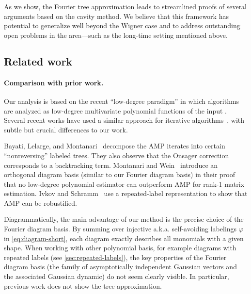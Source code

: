 \documentclass[12pt]{article}
\begin{document}
As we show, the Fourier tree approximation
leads to streamlined proofs of several arguments
based on the cavity method. We believe that
this framework has potential to generalize well beyond the Wigner case and to address outstanding
open problems in the area---such as the long-time setting mentioned above.



\subsection{Related work}\label{sec:related_work}

\paragraph{Comparison with prior work.}
Our analysis is based on the recent ``low-degree paradigm'' in which
algorithms are analyzed as low-degree multivariate polynomial functions of the input \cite{kunisky2019notes}.
Several recent works have used a similar approach for iterative algorithms~\cite{bayati2015universality,montanari2022equivalence,ivkov2023semidefinite}, with subtle but crucial differences to our work.

Bayati, Lelarge, and Montanari~\cite{bayati2015universality} decompose the AMP iterates into certain ``nonreversing'' labeled trees. 
They also observe that the Onsager correction corresponds to a backtracking term. Montanari and Wein~\cite[Section 4.2]{montanari2022equivalence} introduce an orthogonal diagram
basis (similar to our Fourier diagram basis) 
in their proof that no low-degree polynomial
estimator
can outperform AMP for rank-1 matrix estimation.
Ivkov and Schramm~\cite{ivkov2023semidefinite} use a repeated-label representation to show that AMP can be
robustified.


Diagrammatically, the main advantage of our method is the precise choice of the Fourier diagram basis.
By summing over {injective} a.k.a. {self-avoiding} labelings $\varphi$ in \cref{eq:diagram-short}, each diagram exactly describes all monomials with a given shape.
When working with other polynomial basis, for example diagrams with repeated labels \cite{bayati2015universality,ivkov2023semidefinite} (see \cref{sec:repeated-labels}),
the key properties of the Fourier diagram basis (the family of asymptotically independent Gaussian vectors and the associated Gaussian dynamic) do not seem clearly visible.
In particular, previous work does not show 
the tree approximation.
\end{document}
